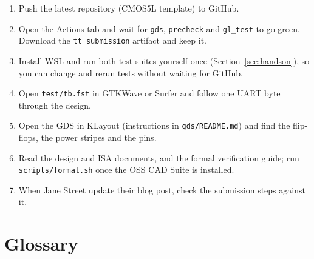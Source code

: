 \documentclass[11pt,a4paper]{article}
\newcommand{\file}[1]{\texttt{#1}}
\newcommand{\cmd}[1]{\texttt{#1}}
\begin{document}
\begin{enumerate}
\item Push the latest repository (CMOS5L template) to GitHub.
\item Open the Actions tab and wait for \cmd{gds}, \cmd{precheck} and \cmd{gl\_test} to go green. Download the \texttt{tt\_submission} artifact and keep it.
\item Install WSL and run both test suites yourself once (Section~\ref{sec:handson}), so you can change and rerun tests without waiting for GitHub.
\item Open \file{test/tb.fst} in GTKWave or Surfer and follow one UART byte through the design.
\item Open the GDS in KLayout (instructions in \file{gds/README.md}) and find the flip-flops, the power stripes and the pins.
\item Read the design and ISA documents, and the formal verification guide; run \file{scripts/formal.sh} once the OSS CAD Suite is installed.
\item When Jane Street update their blog post, check the submission steps against it.
\end{enumerate}

\section{Glossary}
\end{document}
